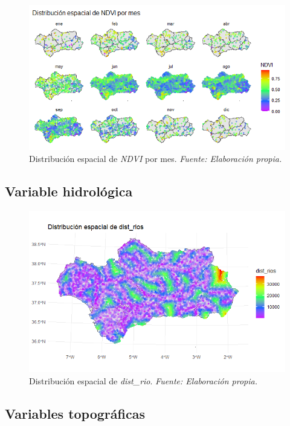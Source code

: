 \documentclass[12pt,a4paper,]{book}
\numberwithin{dummy}{section}
\theoremstyle{ocrenumbox}
\theoremstyle{blacknumex}
\theoremstyle{blacknumbox}
\theoremstyle{ocrenum}
\theoremstyle{ocrenum}
\begin{document}
\begin{figure}[H]
\centering
\includegraphics[width = \textwidth]{graficos/NDVI_spat.png}
\caption[Distribución espacial de \textit{NDVI} por mes]{Distribución espacial de \textit{NDVI} por mes. \it Fuente: Elaboración propia.}
\label{fig:NDVI_spat}
\end{figure}

\hypertarget{variable-hidroluxf3gica}{%
\subsection{Variable hidrológica}\label{variable-hidroluxf3gica}}

\begin{figure}[H]
\centering
\includegraphics[width = \textwidth]{graficos/dist_rios_spat.png}
\caption[Distribución espacial de \textit{dist\_rio}]{Distribución espacial de \textit{dist\_rio}. \it Fuente: Elaboración propia.}
\label{fig:dist_rio_spat}
\end{figure}

\hypertarget{variables-topogruxe1ficas}{%
\subsection{Variables topográficas}\label{variables-topogruxe1ficas}}
\end{document}

